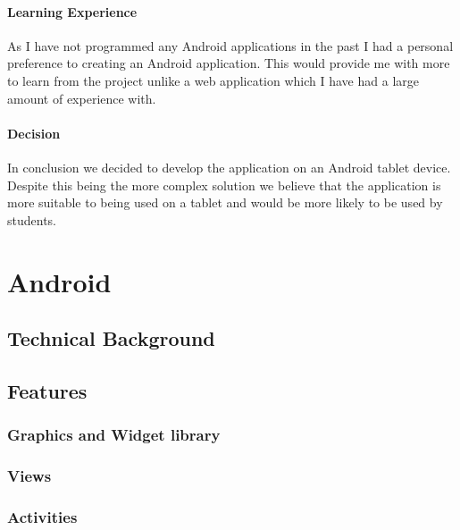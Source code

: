 \documentclass{report}
\begin{document}
\subsubsection{Learning Experience}

As I have not programmed any Android applications in the past I had a personal preference to creating an Android application. This would provide me with more to learn from the project unlike a web application which I have had a large amount of experience with.

\subsubsection{Decision}

In conclusion we decided to develop the application on an Android tablet device. Despite this being the more complex solution we believe that the application is more suitable to being used on a tablet and would be more likely to be used by students.

\chapter{Android}

\section{Technical Background}

\section{Features}

\subsection{Graphics and Widget library}


\subsection{Views}

\subsection{Activities}
\end{document}
